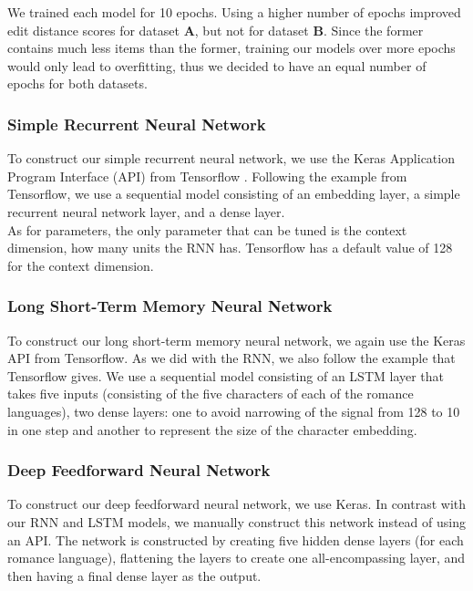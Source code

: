 We trained each model for 10 epochs. Using a higher number of epochs improved edit distance scores for dataset \textbf{A}, but not for dataset \textbf{B}. Since the former contains much less items than the former, training our models over more epochs would only lead to overfitting, thus we decided to have an equal number of epochs for both datasets.

\subsubsection{Simple Recurrent Neural Network}
To construct our simple recurrent neural network, we use the Keras Application Program Interface (API) \cite{chollet2015keras} from Tensorflow \cite{tensorflow2015-whitepaper}. Following the example from Tensorflow, we use a sequential model consisting of an embedding layer, a simple recurrent neural network layer, and a dense layer. \\
As for parameters, the only parameter that can be tuned is the context dimension, how many units the RNN has. Tensorflow has a default value of 128 for the context dimension. 

\subsubsection{Long Short-Term Memory Neural Network}
To construct our long short-term memory neural network, we again use the Keras API from Tensorflow. As we did with the RNN, we also follow the example that Tensorflow gives. We use a sequential model consisting of an LSTM layer that takes five inputs (consisting of the five characters of each of the romance languages), two dense layers: one to avoid narrowing of the signal from 128 to 10 in one step and another to represent the size of the character embedding. 

\subsubsection{Deep Feedforward Neural Network}
To construct our deep feedforward neural network, we use Keras. In contrast with our RNN and LSTM models, we manually construct this network instead of using an API. The network is constructed by creating five hidden dense layers (for each romance language), flattening the layers to create one all-encompassing layer, and then having a final dense layer as the output. 

